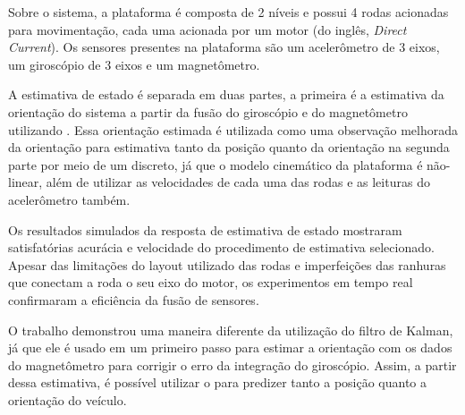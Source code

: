 \documentclass[acronym, symbols, table]{fei}
\begin{document}
Sobre o sistema, a plataforma é composta de 2 níveis e possui 4 rodas acionadas para movimentação, cada uma acionada por um motor  (do inglês, \textit{Direct Current}). Os sensores presentes na plataforma são um acelerômetro de 3 eixos, um giroscópio de 3 eixos e um magnetômetro.

A estimativa de estado é separada em duas partes, a primeira é a estimativa da orientação do sistema a partir da fusão do giroscópio e do magnetômetro utilizando . Essa orientação estimada é utilizada como uma observação melhorada da orientação para estimativa tanto da posição quanto da orientação na segunda parte por meio de um  discreto, já que o modelo cinemático da plataforma é não-linear, além de utilizar as velocidades de cada uma das rodas e as leituras do acelerômetro também.

Os resultados simulados da resposta de estimativa de estado mostraram satisfatórias acurácia e velocidade do procedimento de estimativa selecionado. Apesar das limitações do layout utilizado das rodas e imperfeições das ranhuras que conectam a roda o seu eixo do motor, os experimentos em tempo real confirmaram a eficiência da fusão de sensores.

O trabalho demonstrou uma maneira diferente da utilização do filtro de Kalman, já que ele é usado em um primeiro passo para estimar a orientação com os dados do magnetômetro para corrigir o erro da integração do giroscópio. Assim, a partir dessa estimativa, é possível utilizar o  para predizer tanto a posição quanto a orientação do veículo.

%	
\end{document}
